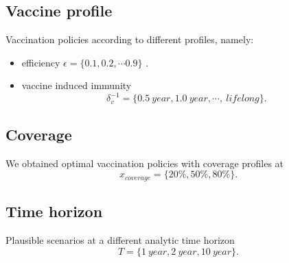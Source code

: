\documentclass[preprint, sort&compress]{elsarticle}
\begin{document}
    \subsection*{Vaccine profile}
    Vaccination policies according to different profiles, namely:
    \begin{itemize}
      \item
          efficiency
          $\epsilon = \{\num{0.1}, \num{0.2}, \cdots  \num{0.9} \}$ .
      \item
        vaccine induced immunity
        $$
          \delta_v ^{-1}=
            \{\SI{0.5}{year},
              \SI{1.0}{year}, \cdots, \SI{}{lifelong}
            \}.
        $$
    \end{itemize}


  \subsection*{Coverage}
    We obtained optimal vaccination policies with coverage profiles at
    $$
      x_{coverage} =
        \{
          20\%, 50\%, 80\%
        \}.
    $$
  \subsection*{Time horizon}
  Plausible scenarios at a different analytic time horizon
  $$
    T= \{ \SI{1}{year}, \SI{2}{year}, \SI{10}{year} \}.
  $$
\end{document}
